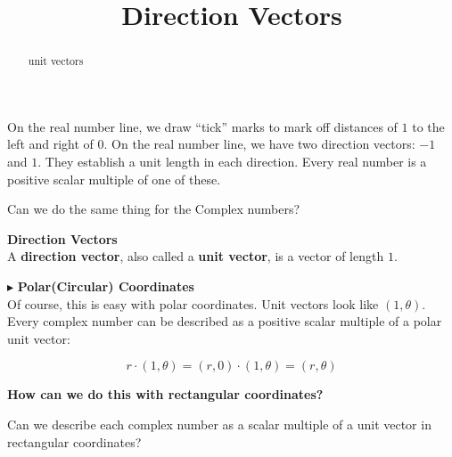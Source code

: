 \documentclass{ximera}
\title{Direction Vectors}
\begin{document}
\begin{abstract}
unit vectors
\end{abstract}
\maketitle




On the real number line, we draw ``tick'' marks to mark off distances of $1$ to the left and right of $0$. On the real number line, we have two direction vectors: $-1$ and $1$.  They establish a unit length in each direction. Every real number is a positive scalar multiple of one of these.

Can we do the same thing for the Complex numbers? \\









\begin{definition}  \textbf{\textcolor{green!50!black}{Direction Vectors}}   \\

A \textbf{direction vector}, also called a \textbf{unit vector}, is a vector of length $1$.

\end{definition}









$\blacktriangleright$ \textbf{\textcolor{blue!75!black}{Polar(Circular) Coordinates}}  \\


Of course, this is easy with polar coordinates.  Unit vectors look like $(1, \theta)$. \\

Every complex number can be described as a positive scalar multiple of a polar unit vector:  


\[
r \cdot (1, \theta) = (r, 0) \cdot (1, \theta) = (r, \theta)
\]



\begin{center}
\textbf{\textcolor{red!80!black}{How can we do this with rectangular coordinates?}}
\end{center}



Can we describe each complex number as a scalar multiple of a unit vector in rectangular coordinates? \\
\end{document}
